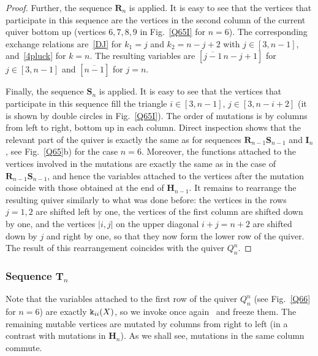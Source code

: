 \documentclass{amsart}
\theoremstyle{definition}
\theoremstyle{remark}
\numberwithin{equation}{section}
\numberwithin{theorem}{section}
\def\Hs{\mathbf H}
\def\Is{\mathbf I}
\def\Rs{\mathbf R}
\def\S{{\mathbf S}}
\def\Ts{\mathbf T}
\def\ek{{\tt k}}
\begin{document}
\begin{proof}
Further, the sequence $\Rs_n$ is applied. It is easy to see that the vertices that participate in this sequence are the vertices in the second column of the current quiver bottom up (vertices $6, 7, 8, 9$ in Fig.~\ref{Q65I} for $n=6$). The corresponding exchange relations are~\eqref{DJ} for
$k_1=j$ and $k_2=n-j+2$ with $j\in[3,n-1]$, and~\eqref{4pluck} for $k=n$. The resulting variables are $[\overline{j-1}\,
n-j+1]$ for $j\in[3,n-1]$ and $[\overline{n-1}]$ for $j=n$.

Finally, the sequence $\S_n$ is applied. It is easy to see that the vertices that participate in this sequence fill the triangle $i\in[3,n-1]$, $j\in[3,n-i+2]$ (it is shown by double circles in Fig.~\ref{Q65I}). The order of mutations is 
by columns from left to right, bottom up in each column. Direct inspection shows that the relevant part of the quiver is exactly the same as for sequences $\Rs_{n-1}\S_{n-1}$ and $\Is_n$, see Fig.~\ref{Q65}b) for the case $n=6$. Moreover, 
the functions attached to the vertices involved in the mutations are exactly the same as in the case of $\Rs_{n-1}\S_{n-1}$, and hence the variables attached to the vertices after the mutation coincide with those obtained at the end of $\Hs_{n-1}$. It remains to rearrange the resulting quiver similarly to what was done before: the vertices in the rows $j=1,2$ 
are shifted left by one, the vertices of the first column are shifted down by one,  and the vertices $|i,j|$ on the upper diagonal $i+j=n+2$ are shifted down by $j$ and right by one, so that they now form the lower row of the quiver. The result of this rearrangement coincides with the quiver $Q_n^n$.
\end{proof}

\subsubsection{Sequence $\Ts_n$} Note that the variables attached to the first row of the quiver $Q_n^n$ (see 
Fig.~\ref{Q66} for $n=6$) are exactly 
$\ek_{ii}(X)$, so we invoke once again~\cite[Th.~3.6]{CL} and freeze them. 
The remaining mutable vertices are mutated by columns from right to left (in a contrast with mutations in $\Hs_n$). As we shall see, mutations in the same column commute. 
\end{document}

